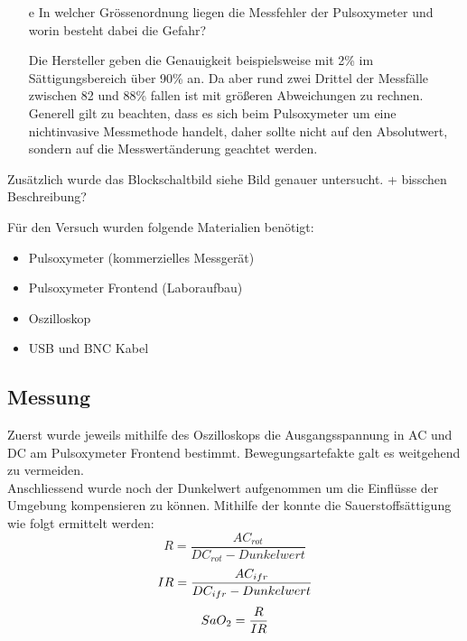 \documentclass[11pt]{scrartcl}
\begin{document}
\begin{itemize}
\begin{equation}
        \end{equation}
        \item[e] In welcher Grössenordnung liegen die Messfehler der Pulsoxymeter und worin
        besteht dabei die Gefahr? 
        \item[] Die Hersteller geben die Genauigkeit beispielsweise mit 2\% im Sättigungsbereich über 90\% an.
        Da aber rund zwei Drittel der Messfälle zwischen 82 und 88\% fallen ist mit größeren Abweichungen zu rechnen. 
        Generell gilt zu beachten, dass es sich beim Pulsoxymeter um eine nichtinvasive Messmethode handelt,
        daher sollte nicht auf den Absolutwert, sondern auf die Messwertänderung geachtet werden.
    \end{itemize}

    Zusätzlich wurde das Blockschaltbild siehe Bild genauer untersucht. + bisschen Beschreibung?


    Für den Versuch wurden folgende Materialien benötigt:

    \begin{itemize}
        \item  Pulsoxymeter (kommerzielles Messgerät)
        \item Pulsoxymeter Frontend (Laboraufbau)
        \item Oszilloskop
        \item USB und BNC Kabel 
        
    \end{itemize}

    \subsection{Messung}
    Zuerst wurde jeweils mithilfe des Oszilloskops die Ausgangsspannung in AC und DC am Pulsoxymeter Frontend bestimmt. 
    Bewegungsartefakte galt es weitgehend zu vermeiden.\\
    Anschliessend wurde noch der Dunkelwert aufgenommen um die Einflüsse der Umgebung kompensieren zu können.
    Mithilfe der \cite{Pulsoxymetrie} konnte die Sauerstoffsättigung wie folgt ermittelt werden:
    \begin{equation}
        R = \frac{AC_{rot}}{DC_{rot} - Dunkelwert} 
    \end{equation}
    \begin{equation}
        IR = \frac{AC_{ifr}}{DC_{ifr} - Dunkelwert} \\
    \end{equation}
    \begin{equation}
        SaO_{2} = \frac{R}{IR} \\
    \end{equation}
\end{document}
